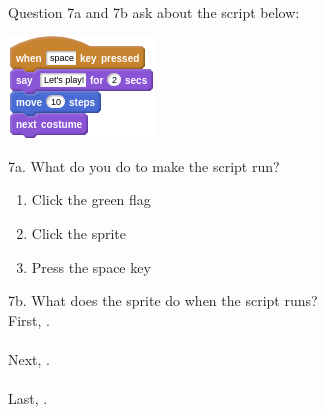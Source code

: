 \documentclass[letterpaper,12pt]{article}
\begin{document}
\noindent \dotfill \\
Question 7a and 7b ask about the script below:
\begin{center}
\includegraphics[scale=.7]{q7_script0.png}
\end{center}

\noindent 7a. What do you do to make the script run?
\renewcommand{\theenumi}{\Alph{enumi}}
\begin{enumerate}
\item Click the green flag
\item Click the sprite
\item Press the space key \\
\end{enumerate}

\noindent 7b. What does the sprite do when the script runs? \\

\noindent First, \hrulefill . \\ \\
Next, \hrulefill . \\ \\
Last, \hrulefill . \\
\end{document}

